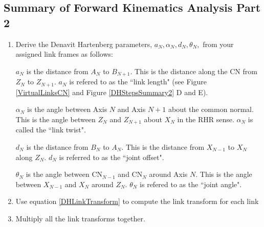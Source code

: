 \subsection{Summary of Forward Kinematics Analysis Part 2}\label{DH_Steps}
\begin{enumerate}
\item Derive the Denavit Hartenberg parameters, $a_N, \alpha_N, d_N, \theta_N,$ from your assigned link frames as follows:

$a_N$ is the distance from $A_N$ to $B_{N+1}$.  This is the distance along the CN from $Z_N$ to $Z_{N+1}$.  $a_N$ is refered to as the ``link length" (see Figure \ref{VirtualLinksCN} and Figure \ref{DHStepsSummary2} D and E).

$\alpha_N$ is the angle between Axis $N$ and Axis $N+1$ about the common normal.  This is the angle between $Z_N$ and $Z_{N+1}$ about $X_N$ in the RHR sense.   $\alpha_N$ is called the ``link twist".

$d_N$ is the distance from $B_N$ to $A_N$.   This is the distance from $X_{N-1}$ to $X_N$ along $Z_N$.   $d_N$ is referred to as the ``joint offset".

$\theta_N$ is the angle between CN$_{N-1}$ and CN$_{N}$ around Axis $N$.  This is the angle between $X_{N-1}$ and $X_N$ around $Z_N$.   $\theta_N$ is refered to as the ``joint angle".

\item Use equation \ref{DHLinkTransform} to compute the link transform for each link


\item Multiply all the link transforms together.

\end{enumerate}





